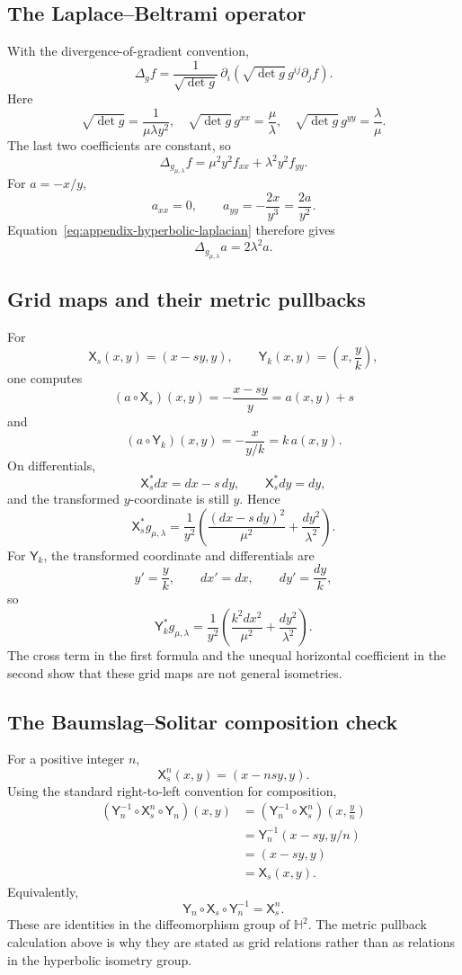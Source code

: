 \subsection{The Laplace--Beltrami operator}

With the divergence-of-gradient convention,
\[
 \Delta_g f
 =\frac1{\sqrt{\det g}}\,
  \partial_i\!\left(\sqrt{\det g}\,g^{ij}\partial_jf\right).
\]
Here
\[
 \sqrt{\det g}=\frac1{\mu\lambda y^2},
 \quad
 \sqrt{\det g}\,g^{xx}=\frac{\mu}{\lambda},
 \quad
 \sqrt{\det g}\,g^{yy}=\frac{\lambda}{\mu}.
\]
The last two coefficients are constant, so
\begin{equation}\label{eq:appendix-hyperbolic-laplacian}
 \Delta_{g_{\mu,\lambda}}f
 =\mu^2y^2f_{xx}+\lambda^2y^2f_{yy}.
\end{equation}
For \(a=-x/y\),
\[
 a_{xx}=0,
 \qquad
 a_{yy}=-\frac{2x}{y^3}=\frac{2a}{y^2}.
\]
Equation~\eqref{eq:appendix-hyperbolic-laplacian} therefore gives
\[
 \Delta_{g_{\mu,\lambda}}a=2\lambda^2a.
\]

\subsection{Grid maps and their metric pullbacks}

For
\[
 \mathsf X_s(x,y)=(x-sy,y),
 \qquad
 \mathsf Y_k(x,y)=\left(x,\frac yk\right),
\]
one computes
\[
 (a\circ\mathsf X_s)(x,y)
 =-\frac{x-sy}{y}=a(x,y)+s
\]
and
\[
 (a\circ\mathsf Y_k)(x,y)
 =-\frac{x}{y/k}=k\,a(x,y).
\]
On differentials,
\[
 \mathsf X_s^*dx=dx-s\,dy,\qquad
 \mathsf X_s^*dy=dy,
\]
and the transformed \(y\)-coordinate is still \(y\).  Hence
\[
 \mathsf X_s^*g_{\mu,\lambda}
 =\frac1{y^2}
  \left(
   \frac{(dx-s\,dy)^2}{\mu^2}
   +\frac{dy^2}{\lambda^2}
  \right).
\]
For \(\mathsf Y_k\), the transformed coordinate and differentials are
\[
 y'=\frac yk,\qquad dx'=dx,\qquad dy'=\frac{dy}{k},
\]
so
\[
 \mathsf Y_k^*g_{\mu,\lambda}
 =\frac1{y^2}
  \left(
   \frac{k^2dx^2}{\mu^2}
   +\frac{dy^2}{\lambda^2}
  \right).
\]
The cross term in the first formula and the unequal horizontal coefficient in
the second show that these grid maps are not general isometries.

\subsection{The Baumslag--Solitar composition check}

For a positive integer \(n\),
\[
 \mathsf X_s^n(x,y)=(x-nsy,y).
\]
Using the standard right-to-left convention for composition,
\begin{align*}
 (\mathsf Y_n^{-1}\circ\mathsf X_s^n\circ\mathsf Y_n)(x,y)
 &=(\mathsf Y_n^{-1}\circ\mathsf X_s^n)
   \left(x,\frac yn\right)\\
 &=\mathsf Y_n^{-1}(x-sy,y/n)\\
 &=(x-sy,y)\\
 &=\mathsf X_s(x,y).
\end{align*}
Equivalently,
\[
 \mathsf Y_n\circ\mathsf X_s\circ\mathsf Y_n^{-1}
 =\mathsf X_s^n.
\]
These are identities in the diffeomorphism group of \(\mathbb H^2\).  The metric
pullback calculation above is why they are stated as grid relations rather than
as relations in the hyperbolic isometry group.
